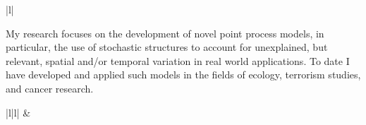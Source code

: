 \documentclass[12pt, a4paper]{article}
\begin{document}
\begin{center}\begin{tabular}{|l|}
\hline {}   \\
\hline
\end{tabular}\end{center}
\vspace{-0.3 cm} {\it {


\noindent My research focuses on the development of novel point process models, in particular, the use of stochastic structures to account for unexplained, but relevant, spatial and/or temporal variation in real world applications. To date I have developed and applied such models in the fields of ecology, terrorism studies, and cancer research.
}\par}

\begin{center}\begin{tabular}{|l|l|}
\hline {}   &    \\
\hline
\end{tabular}\end{center}
\vspace{-0.3 cm} {\it {


\noindent
}\par}
\end{document}
